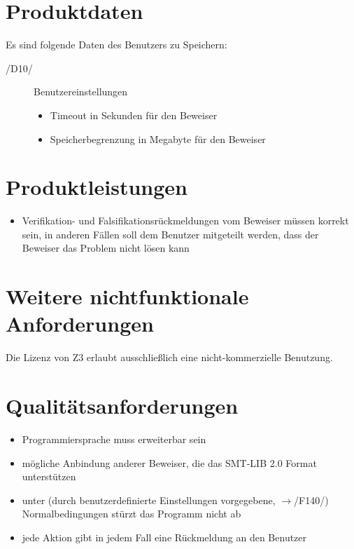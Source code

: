 \documentclass[a4paper,10pt]{article}
\begin{document}
\section{Produktdaten}
Es sind folgende Daten des Benutzers zu Speichern:
\begin{description}
\item[/D10/] Benutzereinstellungen
\begin{itemize}
  \item Timeout in Sekunden für den Beweiser
  \item Speicherbegrenzung in Megabyte für den Beweiser
\end{itemize}
\end{description}

\section{Produktleistungen}
\begin{itemize}
  \item Verifikation- und Falsifikationsrückmeldungen vom Beweiser müssen korrekt sein, in anderen Fällen soll dem Benutzer mitgeteilt werden, dass der Beweiser das Problem nicht lösen kann
\end{itemize}

\section{Weitere nichtfunktionale Anforderungen}
Die Lizenz von Z3 erlaubt ausschließlich eine nicht-kommerzielle Benutzung.

\section{Qualitätsanforderungen}
\begin{itemize}
  \item Programmiersprache muss erweiterbar sein
  \item mögliche Anbindung anderer Beweiser, die das SMT-LIB 2.0 Format unterstützen
  \item unter (durch benutzerdefinierte Einstellungen vorgegebene, $\to$/F140/) Normalbedingungen stürzt das Programm nicht ab
  \item jede Aktion gibt in jedem Fall eine Rückmeldung an den Benutzer
\end{itemize}
\end{document}
